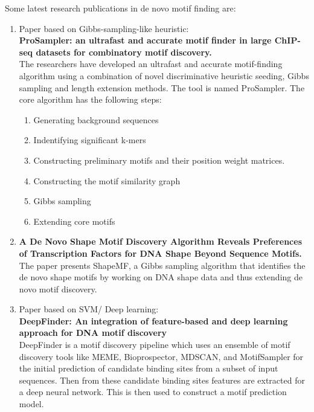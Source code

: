 \documentclass[solution,addpoints,12pt]{exam}
\begin{document}
\begin{questions}
\begin{parts}
\begin{solution}
Some latest research publications in de novo motif finding are:
\begin{enumerate}
\item Paper based on Gibbs-sampling-like heuristic: \\ \textbf{ProSampler: an ultrafast and accurate motif finder in large ChIP-seq datasets for combinatory motif discovery.} \textsuperscript{\cite{10.1093/bioinformatics/btz290}}\\
The researchers have developed an ultrafast and accurate motif-finding algorithm using a combination of novel discriminative heuristic seeding, Gibbs sampling and length extension methods. The tool is named ProSampler.
The core algorithm has the following steps:
\begin{enumerate}
\item Generating background sequences
\item Indentifying significant k-mers
\item Constructing preliminary motifs and their position weight matrices.
\item Constructing the motif similarity graph
\item Gibbs sampling
\item Extending core motifs
\end{enumerate}
\pagebreak
\item \textbf{A De Novo Shape Motif Discovery Algorithm Reveals Preferences of Transcription Factors for DNA Shape Beyond Sequence Motifs.}\textsuperscript{\cite{SAMEE201927}}\\
The paper presents ShapeMF, a Gibbs sampling algorithm that identifies the de novo shape motifs by working on DNA shape data and thus extending de novo motif discovery.
\item Paper based on SVM/ Deep learning:\\
\textbf{DeepFinder: An integration of feature-based and deep learning approach for DNA motif discovery}\textsuperscript{\cite{deepfinder}}\\
 DeepFinder is a motif discovery pipeline which uses an ensemble of motif discovery tools like MEME, Bioprospector, MDSCAN, and MotifSampler for the initial prediction of candidate binding sites from a subset of input sequences. Then from these candidate binding sites features are extracted for a deep neural network. This is then used to construct a motif prediction model.
\end{enumerate}
\end{solution}

\end{parts}





\end{questions}
\end{document}
